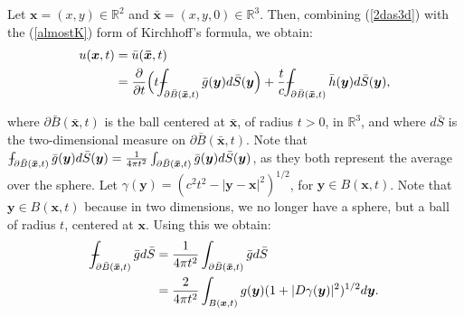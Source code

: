 \documentclass[a4paper, 12pt]{article}
\def\Xint#1{\mathchoice
{\XXint\displaystyle\textstyle{#1}}%
{\XXint\textstyle\scriptstyle{#1}}%
{\XXint\scriptstyle\scriptscriptstyle{#1}}%
{\XXint\scriptscriptstyle\scriptscriptstyle{#1}}%
\!\int}
\def\XXint#1#2#3{{\setbox0=\hbox{$#1{#2#3}{\int}$ }
\vcenter{\hbox{$#2#3$ }}\kern-.6\wd0}}
\def\dashint{\Xint-}
\numberwithin{equation}{section}
\begin{document}
Let $\boldsymbol{x}=(x,y)\in \mathbb{R}^2$ and $\boldsymbol{\bar{x}}=(x,y, 0)\in
\mathbb{R}^3$. Then, combining (\ref{2das3d}) with the (\ref{almostK}) form of
Kirchhoff's formula, we obtain:
\begin{equation} \label{star}
    \begin{aligned}
        u(\boldsymbol{x},t)&=\bar{u}(\boldsymbol{\bar{x}}, t)\\
        &=\diffp[1]{}{t}\Big(t\dashint_{\partial \bar{B}(\boldsymbol{\bar{x}}, t)} \bar{g}(\boldsymbol{y}) d\bar{S}(\boldsymbol{y}\Big)+\frac{t}{c} \dashint_{\partial \bar{B}(\boldsymbol{\bar{x}}, t)} \bar{h}(\boldsymbol{y})d\bar{S}(\boldsymbol{y}),
    \end{aligned}
\end{equation}

where $\partial\bar{B}(\boldsymbol{\bar{x}},t)$ is the ball centered at
$\boldsymbol{\bar{x}}$, of radius $t>0$, in $\mathbb{R}^3$, and where $d\bar{S}$
is the two-dimensional measure on $\partial\bar{B}(\boldsymbol{\bar{x}},t)$.
Note that $\dashint_{\partial \bar{B}(\boldsymbol{\bar{x}}, t)}
\bar{g}(\boldsymbol{y}) d\bar{S}(\boldsymbol{y})=\frac{1}{4\pi
t^2}\int_{\partial \bar{B}(\boldsymbol{\bar{x}}, t)}\bar{g} (\boldsymbol{y})
d\bar{S} (\boldsymbol{y})$, as they both represent the average over the sphere.
Let $\gamma (\boldsymbol{y})=(c^2 t^2-|\boldsymbol{y}-\boldsymbol{x}|^2)^{1/2}$,
for $\boldsymbol{y} \in B(\boldsymbol{x}, t)$. Note that $\boldsymbol{y} \in
B(\boldsymbol{x}, t)$ because in two dimensions, we no longer have a sphere, but
a ball of radius $t$, centered at $\boldsymbol{x}$. Using this we obtain:
\begin{equation} \label{tired}
    \begin{aligned}
        \dashint_{\partial \bar{B}(\boldsymbol{\bar{x}}, t)} \bar{g} d\bar{S}&=\frac{1}{4\pi t^2}\int_{\partial \bar{B}(\boldsymbol{\bar{x}}, t)}\bar{g} d\bar{S}\\
        &=\frac{2}{4 \pi t^2} \int_{B(\boldsymbol{x}, t)} g(\boldsymbol{y})(1+|D\gamma (\boldsymbol{y})|^2)^{1/2}d\boldsymbol{y}.
    \end{aligned}
\end{equation}
\end{document}

